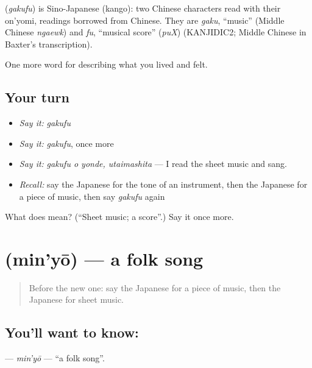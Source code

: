 \begin{cousinweb}
\textbf{} (\emph{gakufu}) is Sino-Japanese (kango): two Chinese characters read with their on'yomi, readings borrowed from Chinese. They are \emph{gaku}, \textquotedblleft{}music\textquotedblright{} (Middle Chinese \emph{ngaewk}) and \emph{fu}, \textquotedblleft{}musical score\textquotedblright{} (\emph{puX}) (KANJIDIC2; Middle Chinese in Baxter's transcription).
\end{cousinweb}

\begin{grammarlens}[title={What you've built}]
One more word for describing what you lived and felt.
\end{grammarlens}

\subsection*{Your turn}
\begin{itemize}
\raggedright
  \item \emph{Say it:} \emph{gakufu}
  \item \emph{Say it:} \emph{gakufu}, once more
  \item \emph{Say it:} \emph{gakufu o yonde, utaimashita} — I read the sheet music and sang.
  \item \emph{Recall:} say the Japanese for the tone of an instrument, then the Japanese for a piece of music, then say \emph{gakufu} again
\end{itemize}

\begin{tcolorbox}[breakable,colback=teal!4,colframe=teal!35!black,title={Before you move on}]
What does  mean? (\textquotedblleft{}Sheet music; a score\textquotedblright{}.) Say it once more.
\end{tcolorbox}
\section[\texorpdfstring{\ja{みんよう} (min'yō)}{みんよう (min'yō)}]{ (min'yō) — a folk song}

\label{lesson:JA-C470-min-you}



\begin{quote}
Before the new one: say the Japanese for a piece of music, then the Japanese for sheet music.
\end{quote}

\subsection*{You'll want to know: }
\textbf{} — \emph{min'yō} — \textquotedblleft{}a folk song\textquotedblright{}.

